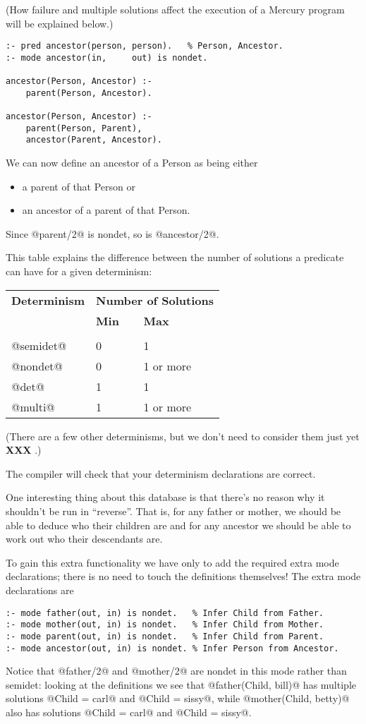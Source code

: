 \documentclass[a4paper,11pt,notitlepage,onecolumn]{article}
\newcommand{\XXX}[1]%
{{\small\textbf{XXX} \emph{#1}}}
\begin{document}
(How failure and multiple solutions affect the execution of a
Mercury program will be explained below.)
\begin{verbatim}
:- pred ancestor(person, person).   % Person, Ancestor.
:- mode ancestor(in,     out) is nondet.

ancestor(Person, Ancestor) :-
    parent(Person, Ancestor).

ancestor(Person, Ancestor) :-
    parent(Person, Parent),
    ancestor(Parent, Ancestor).
\end{verbatim}
We can now define an ancestor of a Person as being either
\begin{itemize}
\item a parent of that Person or
\item an ancestor of a parent of that Person.
\end{itemize}

Since @parent/2@ is nondet, so is @ancestor/2@.

This table explains the difference between the number of
solutions a predicate can have for a given determinism:

\begin{tabular}{lll}
\textbf{Determinism}       & \multicolumn{2}{l}{\textbf{Number of Solutions}} \\
            & \textbf{Min} & \textbf{Max} \\
\hline \\
@semidet@   & 0            & 1 \\
@nondet@    & 0            & 1 or more \\
@det@       & 1            & 1 \\
@multi@     & 1            & 1 or more \\
\end{tabular}

(There are a few other determinisms, but we don't need to
consider them just yet \XXX{}.)

The compiler will check that your determinism declarations are
correct.

One interesting thing about this database is that there's no
reason why it shouldn't be run in ``reverse''.  That is, for any
father or mother, we should be able to deduce who their
children are and for any ancestor we should be able to work
out who their descendants are.

To gain this extra functionality we have only to add the
required extra mode declarations; there is no need to touch
the definitions themselves!  The extra mode declarations are
\begin{verbatim}
:- mode father(out, in) is nondet.   % Infer Child from Father.
:- mode mother(out, in) is nondet.   % Infer Child from Mother.
:- mode parent(out, in) is nondet.   % Infer Child from Parent.
:- mode ancestor(out, in) is nondet. % Infer Person from Ancestor.
\end{verbatim}
Notice that @father/2@ and @mother/2@ are nondet in this mode
rather than semidet: looking at the definitions we see that
@father(Child, bill)@ has multiple solutions @Child = carl@ and
@Child = sissy@, while @mother(Child, betty)@ also has solutions
@Child = carl@ and @Child = sissy@.
\end{document}
